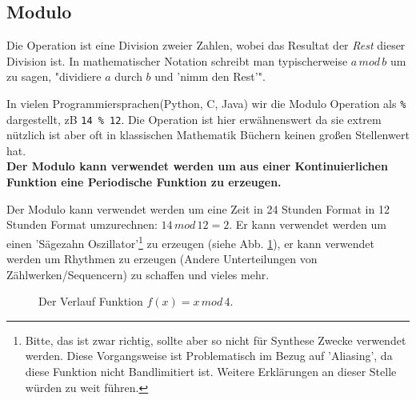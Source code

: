 

\subsection{Modulo}

Die \emph{} Operation ist eine Division zweier Zahlen, wobei das Resultat der \emph{Rest} dieser Division ist. In mathematischer Notation schreibt man typischerweise $a \, mod \, b$ um zu sagen, "dividiere $a$ durch $b$ und 'nimm den Rest'".

In vielen Programmiersprachen(Python, C, Java) wir die Modulo Operation als \texttt{\%} dargestellt, zB \texttt{14 \% 12}. Die Operation ist hier erwähnenswert da sie extrem nützlich ist aber oft in klassischen Mathematik Büchern keinen großen Stellenwert hat. \\
\textbf{Der Modulo kann verwendet werden um aus einer Kontinuierlichen Funktion eine Periodische Funktion zu erzeugen.}

Der Modulo kann verwendet werden um eine Zeit in 24 Stunden Format in 12 Stunden Format umzurechnen: $14 \, mod \, 12 = 2$. Er kann verwendet werden um einen 'Sägezahn Oszillator'\footnote{Bitte, das ist zwar richtig, sollte aber so nicht für Synthese Zwecke verwendet werden. Diese Vorgangsweise ist Problematisch im Bezug auf 'Aliasing', da diese Funktion nicht Bandlimitiert ist. Weitere Erklärungen an dieser Stelle würden zu weit führen.} zu erzeugen (siehe Abb. \ref{fig:modulo}), er kann verwendet werden um Rhythmen zu erzeugen (Andere Unterteilungen von Zählwerken/Sequencern) zu schaffen und vieles mehr.



\begin{figure}[H]
    \centering
    
    \caption{Der Verlauf Funktion $f(x) =  x \, mod \, 4$.}
    \label{fig:modulo}
\end{figure}





